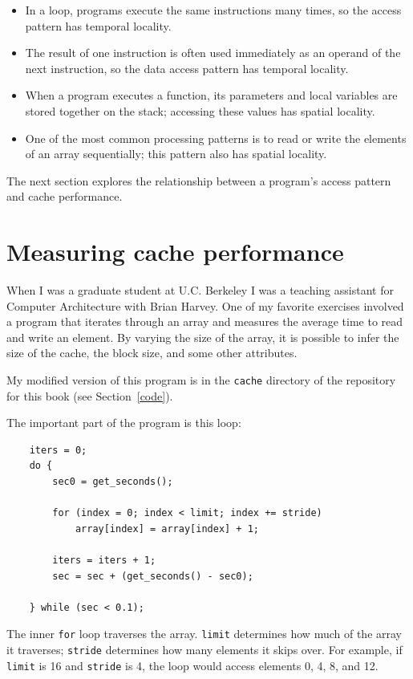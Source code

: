 \documentclass[12pt]{book}
\begin{document}
{\begin{itemize}
\item In a loop, programs execute the same instructions many
times, so the access pattern has temporal locality.

\item The result of one instruction is often used immediately as
an operand of the next instruction, so the data access pattern
has temporal locality.

\item When a program executes a function, its parameters and local
variables are stored together on the stack; accessing these values
has spatial locality.

\item One of the most common processing patterns is to read or write
the elements of an array sequentially; this pattern also has
spatial locality.

\end{itemize}

The next section explores the relationship
between a program's access pattern and cache performance.


\section{Measuring cache performance}

When I was a graduate student at U.C. Berkeley I was a teaching
assistant for Computer Architecture with Brian Harvey.  One of my
favorite exercises involved a program that iterates through an array
and measures the average time to read and write an element.  By
varying the size of the array, it is possible to infer the size
of the cache, the block size, and some other attributes.

My modified version of this program is in the {\tt cache} directory
of the repository for this
book (see Section~\ref{code}).

The important part of the program is this loop:

\begin{verbatim}
    iters = 0;
    do {
        sec0 = get_seconds();

        for (index = 0; index < limit; index += stride) 
            array[index] = array[index] + 1;
        
        iters = iters + 1; 
        sec = sec + (get_seconds() - sec0);
        
    } while (sec < 0.1);
\end{verbatim}

The inner {\tt for} loop traverses the array.  {\tt limit}
determines how much of the array it traverses; {\tt stride}
determines how many elements it skips over.  For example, if
{\tt limit} is 16 and {\tt stride} is 4, the loop would access
elements 0, 4, 8, and 12.

}
\end{document}
